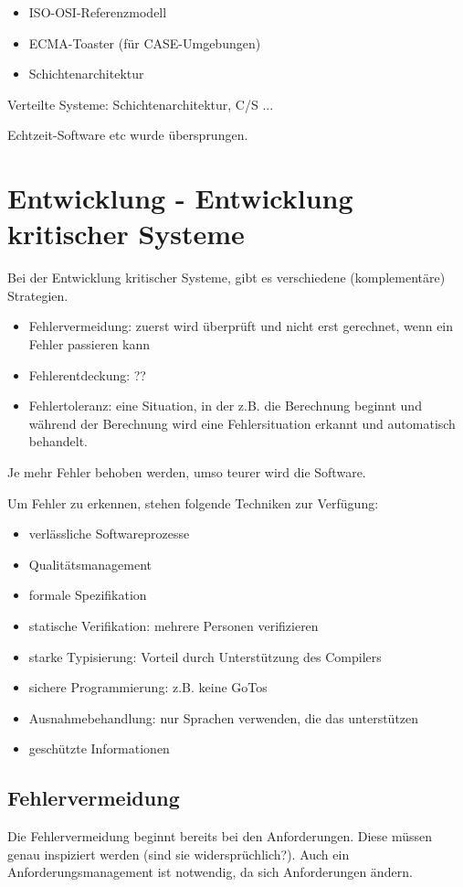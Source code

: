 \begin{itemize}
\item ISO-OSI-Referenzmodell
\item ECMA-Toaster (für CASE-Umgebungen)
\item Schichtenarchitektur 
\end{itemize}

Verteilte Systeme: Schichtenarchitektur, C/S ... 

Echtzeit-Software etc wurde übersprungen.

\section{Entwicklung - Entwicklung kritischer Systeme}
Bei der Entwicklung kritischer Systeme, gibt es verschiedene (komplementäre) Strategien.
\begin{itemize}
\item Fehlervermeidung: zuerst wird überprüft und nicht erst gerechnet, wenn ein Fehler passieren kann
\item Fehlerentdeckung: ??
\item Fehlertoleranz: eine Situation, in der z.B. die Berechnung beginnt und während der Berechnung wird eine Fehlersituation erkannt und automatisch behandelt.
\end{itemize}

Je mehr Fehler behoben werden, umso teurer wird die Software.

Um Fehler zu erkennen, stehen folgende Techniken zur Verfügung:
\begin{itemize}
\item verlässliche Softwareprozesse
\item Qualitätsmanagement
\item formale Spezifikation
\item statische Verifikation: mehrere Personen verifizieren
\item starke Typisierung: Vorteil durch Unterstützung des Compilers
\item sichere Programmierung: z.B. keine GoTos
\item Ausnahmebehandlung: nur Sprachen verwenden, die das unterstützen
\item geschützte Informationen
\end{itemize}

\subsection{Fehlervermeidung}
Die Fehlervermeidung beginnt bereits bei den Anforderungen. Diese müssen genau inspiziert werden (sind sie widersprüchlich?). Auch ein Anforderungsmanagement ist notwendig, da sich Anforderungen ändern.

